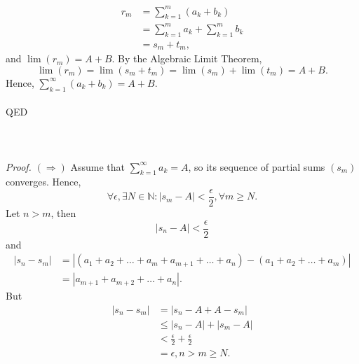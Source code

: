 \documentclass{article}
\begin{document}
            \begin{align*}
                r_m & = \sum_{k=1}^m (a_k+b_k) \\
                & = \sum_{k=1}^m a_k + \sum_{k=1}^m b_k \\
                & = s_m + t_m,
            \end{align*}
            and $\lim(r_m)=A+B$. By the Algebraic Limit Theorem, 
            \begin{equation*}
                \lim(r_m) = \lim(s_m+t_m) = \lim(s_m)+\lim(t_m) = A+B.
            \end{equation*}
            Hence, $\sum_{k=1}^\infty (a_k+b_k)=A+B$.
            \\ \\
            QED
            \\ \\
            \\ \\
            \textit{Proof.} 
            $(\Rightarrow)$ Assume that $\sum_{k=1}^\infty a_k = A$, so its sequence of partial sums $(s_m)$ converges. Hence,
            \begin{equation*}
                \forall \epsilon, \exists N \in \mathbb{N}: |s_m -A| < \frac{\epsilon}{2}, \forall m \geq N.
            \end{equation*}
            Let $n > m$, then
            \begin{equation*}
                |s_n -A| < \frac{\epsilon}{2}
            \end{equation*}
            and
            \begin{align*}
                |s_n - s_m| & = |(a_1+a_2+\dots+a_m+a_{m+1}+\dots +a_n)-(a_1+a_2+\dots+a_m)| \\
                & = |a_{m+1}+a_{m+2}+\dots+a_n|.
            \end{align*}
            But
            \begin{align*}
                |s_n - s_m| & = |s_n -A +A-s_m| \\
                & \leq |s_n-A|+|s_m-A| \\
                & < \frac{\epsilon}{2}+\frac{\epsilon}{2}\\
                & = \epsilon, n > m \geq N.
            \end{align*}
\end{document}
